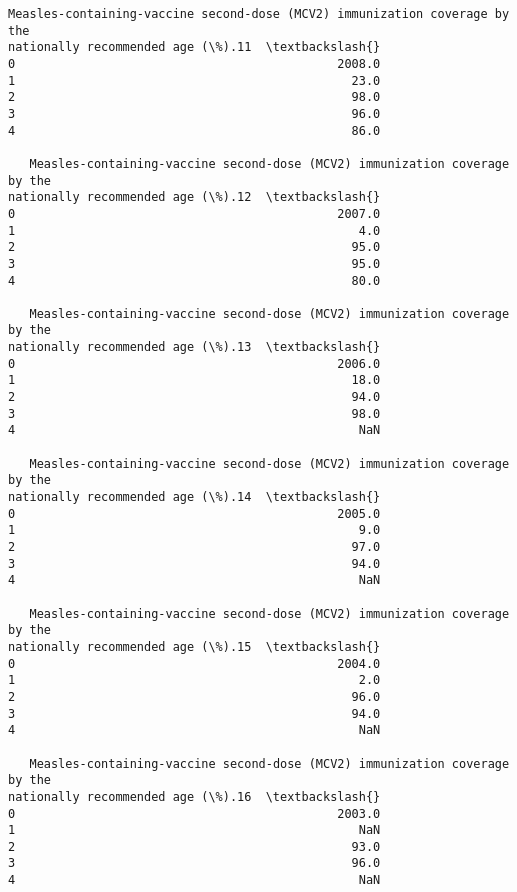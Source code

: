 \documentclass[11pt]{article}
\begin{document}
\begin{tcolorbox}[breakable, size=fbox, boxrule=.5pt, pad at break*=1mm, opacityfill=0]
\begin{Verbatim}[commandchars=\\\{\}]
   Measles-containing-vaccine second-dose (MCV2) immunization coverage by the
nationally recommended age (\%).11  \textbackslash{}
0                                             2008.0
1                                               23.0
2                                               98.0
3                                               96.0
4                                               86.0

   Measles-containing-vaccine second-dose (MCV2) immunization coverage by the
nationally recommended age (\%).12  \textbackslash{}
0                                             2007.0
1                                                4.0
2                                               95.0
3                                               95.0
4                                               80.0

   Measles-containing-vaccine second-dose (MCV2) immunization coverage by the
nationally recommended age (\%).13  \textbackslash{}
0                                             2006.0
1                                               18.0
2                                               94.0
3                                               98.0
4                                                NaN

   Measles-containing-vaccine second-dose (MCV2) immunization coverage by the
nationally recommended age (\%).14  \textbackslash{}
0                                             2005.0
1                                                9.0
2                                               97.0
3                                               94.0
4                                                NaN

   Measles-containing-vaccine second-dose (MCV2) immunization coverage by the
nationally recommended age (\%).15  \textbackslash{}
0                                             2004.0
1                                                2.0
2                                               96.0
3                                               94.0
4                                                NaN

   Measles-containing-vaccine second-dose (MCV2) immunization coverage by the
nationally recommended age (\%).16  \textbackslash{}
0                                             2003.0
1                                                NaN
2                                               93.0
3                                               96.0
4                                                NaN


\end{Verbatim}
\end{tcolorbox}
\end{document}
